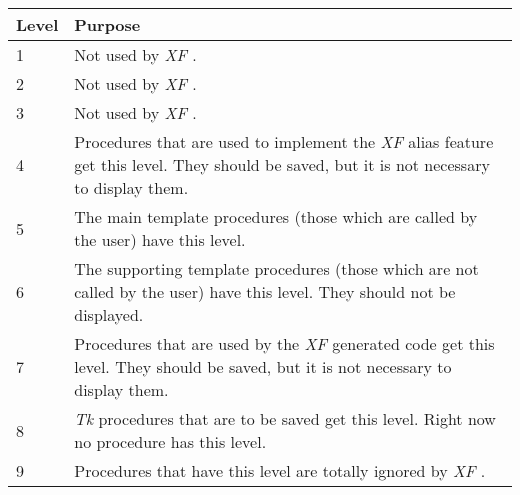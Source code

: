 {\newpage
\clearpage
\samepage \begin{tabular}{|l|p{8.5cm}|} \hline
Level & Purpose\\  \hline
1     & Not used by {\em XF}
.\\  \hline
2     & Not used by {\em XF}
.\\  \hline
3     & Not used by {\em XF}
.\\  \hline
4     & Procedures that are used to implement the {\em XF }
 alias
         feature get this level. They should be saved, but it
         is not necessary to display them.\\  \hline
5     & The main template procedures (those which are called
         by the user) have this level.\\  \hline
6     & The supporting template procedures (those which are
         not called by the user) have this level. They should
         not be displayed.\\  \hline
7     & Procedures that are used by the {\em XF }
 generated code
         get this level. They should be saved, but it is not
         necessary to display them.\\  \hline
8     & {\em Tk }
 procedures that are to be saved get this level.
         Right now no procedure has this level.\\  \hline
9     & Procedures that have this level are totally ignored
         by {\em XF}
.\\  \hline
\end{tabular}
}

{\newpage
\clearpage
\samepage \begin{figure}[ht]
  \centerline{
  \epsfysize=6cm
  }

  \label{fig:BYO design}
\end{figure}
}

{\newpage
\clearpage
\samepage \begin{figure}[ht]
  \centerline{
  \epsfysize=6cm
  }

  \label{fig:XF design}
\end{figure}
}

